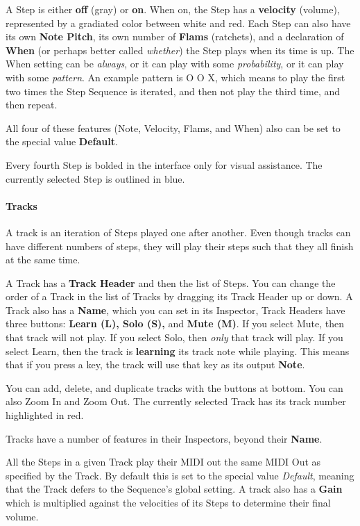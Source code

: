 \documentclass[twoside,10pt]{article}
\begin{document}
A Step is either {\bf off} (gray) or {\bf on}.  When on, the Step has a {\bf velocity} (volume), represented by a gradiated color between white and red.  Each Step can also have its own {\bf Note Pitch}, its own number of {\bf Flams} (ratchets), and a declaration of {\bf When} (or perhaps better called {\it whether}) the Step plays when its time is up.  The When setting can be {\it always}, or it can play with some {\it probability}, or it can play with some {\it pattern}.  An example pattern is \textsf{O O X}, which means to play the first two times the Step Sequence is iterated, and then not play the third time, and then repeat. 

All four of these features (Note, Velocity, Flams, and When) also can be set to the special value {\bf Default}.   

Every fourth Step is bolded in the interface only for visual assistance.    The currently selected Step is outlined in blue.

\paragraph{Tracks}

A track is an iteration of Steps played one after another.  Even though tracks can have different numbers of steps, they will play their steps such that they all finish at the same time.

A Track has a {\bf Track Header} and then the list of Steps.  You can change the order of a Track in the list of Tracks by dragging its Track Header up or down.  A Track also has a {\bf Name}, which you can set in its Inspector,  Track Headers have three buttons: {\bf Learn (L), Solo (S),} and {\bf Mute (M)}.  If you select Mute, then that track will not play.  If you select Solo, then {\it only} that track will play.  If you select Learn, then the track is {\bf learning} its track note while playing.  This means that if you press a key, the track will use that key as its output {\bf Note}.     

You can add, delete, and duplicate tracks with the buttons at bottom.  You can also Zoom In and Zoom Out.  The currently selected Track has its track number highlighted in red.

Tracks have a number of features in their Inspectors, beyond their {\bf Name}.

All the Steps in a given Track play their MIDI out the same MIDI Out as specified by the Track.  By default this is set to the special value {\it Default}, meaning that the Track defers to the Sequence's global setting.  A track also has a {\bf Gain} which is multiplied against the velocities of its Steps to determine their final volume.  
\end{document}
